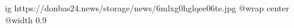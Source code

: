  
 
 
 
 

\ifcmt
  ig https://donbas24.news/storage/news/6mlxg0hglqee06te.jpg
  @wrap center
  @width 0.9
\fi
